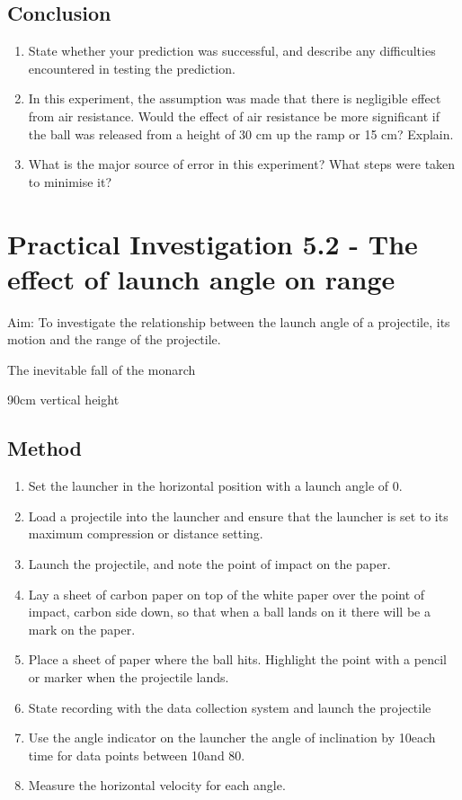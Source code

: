 	\subsection{Conclusion}
		\begin{enumerate}
			\item State whether your prediction was successful, and describe any difficulties encountered in testing the prediction.
			\item In this experiment, the assumption was made that there is negligible effect from air resistance. Would the effect of air resistance be more significant if the ball was released from a height of 30 cm up the ramp or 15 cm? Explain.
			\item What is the major source of error in this experiment? What steps were taken to minimise it?
		\end{enumerate}


\section{Practical Investigation 5.2 - The effect of launch angle on range}

	Aim: To investigate the relationship between the launch angle of a projectile, its motion and the range of the projectile. \;

	The inevitable fall of the monarch

90cm vertical height
	\subsection{Method}
		\begin{enumerate}
			\item Set the launcher in the horizontal position with a launch angle of 0\textdegree.
			\item Load a projectile into the launcher and ensure that the launcher is set to its maximum compression or distance setting.
			\item Launch the projectile, and note the point of impact on the paper.
			\item Lay a sheet of carbon paper on top of the white paper over the point of impact, carbon side down, so that when a ball lands on it there will be a mark on the paper.
			\item Place a sheet of paper where the ball hits. Highlight the point with a pencil or marker when the projectile lands.
			\item State recording with the data collection system and launch the projectile
			\item Use the angle indicator on the launcher the angle of inclination by 10\textdegree each time for data points between 10\textdegree and 80\textdegree.
			\item Measure the horizontal velocity for each angle.
		\end{enumerate}

